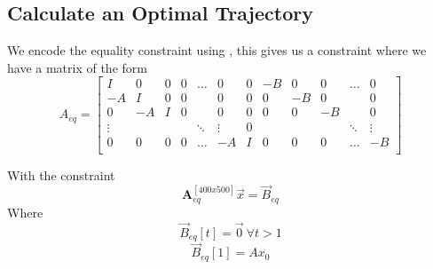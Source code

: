 \subsection{Calculate an Optimal Trajectory}
We encode the equality constraint using , this gives us a constraint where we have a matrix of the form
\begin{equation}
A_{eq} =
\begin{bmatrix}
    I      & 0  & 0 & 0 & \hdots & 0      & 0  & -B & 0  & 0  & \hdots & 0\\
    -A     & I  & 0 & 0 &        & 0      & 0  & 0  & -B & 0  &        & 0\\
    0      & -A & I & 0 &        & 0      & 0  & 0  & 0  & -B &        & 0\\
    \vdots &    &   &   & \ddots & \vdots & 0  &    &    &    & \ddots & \vdots\\
    0      & 0  & 0 & 0 & \hdots & -A     & I  & 0  & 0  & 0  & \hdots & -B\\
\end{bmatrix}
\end{equation}

With the constraint
\begin{equation}
\mathbf{A}_{eq}^{[400x500]} \vec{x} = \vec{B}_{eq}
\end{equation}
Where
\begin{equation}
\vec{B}_{eq}[t] = \vec{0}\ \forall t > 1
\end{equation}
\begin{equation}
\vec{B}_{eq}[1] = Ax_0
\end{equation}

